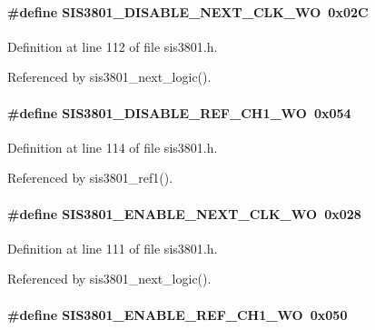 \paragraph[{SIS3801\_\-DISABLE\_\-NEXT\_\-CLK\_\-WO}]{\setlength{\rightskip}{0pt plus 5cm}\#define SIS3801\_\-DISABLE\_\-NEXT\_\-CLK\_\-WO~0x02C}\hfill\label{sis3801_8h_a77c1c1278318716935e26c395d267b73}


Definition at line 112 of file sis3801.h.

Referenced by sis3801\_\-next\_\-logic().
\paragraph[{SIS3801\_\-DISABLE\_\-REF\_\-CH1\_\-WO}]{\setlength{\rightskip}{0pt plus 5cm}\#define SIS3801\_\-DISABLE\_\-REF\_\-CH1\_\-WO~0x054}\hfill\label{sis3801_8h_a43c44f8497c7e148cb4abb4158314ce9}


Definition at line 114 of file sis3801.h.

Referenced by sis3801\_\-ref1().
\paragraph[{SIS3801\_\-ENABLE\_\-NEXT\_\-CLK\_\-WO}]{\setlength{\rightskip}{0pt plus 5cm}\#define SIS3801\_\-ENABLE\_\-NEXT\_\-CLK\_\-WO~0x028}\hfill\label{sis3801_8h_ada1711321a5e7d7f825b1000b9f84963}


Definition at line 111 of file sis3801.h.

Referenced by sis3801\_\-next\_\-logic().
\paragraph[{SIS3801\_\-ENABLE\_\-REF\_\-CH1\_\-WO}]{\setlength{\rightskip}{0pt plus 5cm}\#define SIS3801\_\-ENABLE\_\-REF\_\-CH1\_\-WO~0x050}\hfill\label{sis3801_8h_a9c954d15c731258780ea6ed68ee097d7}


